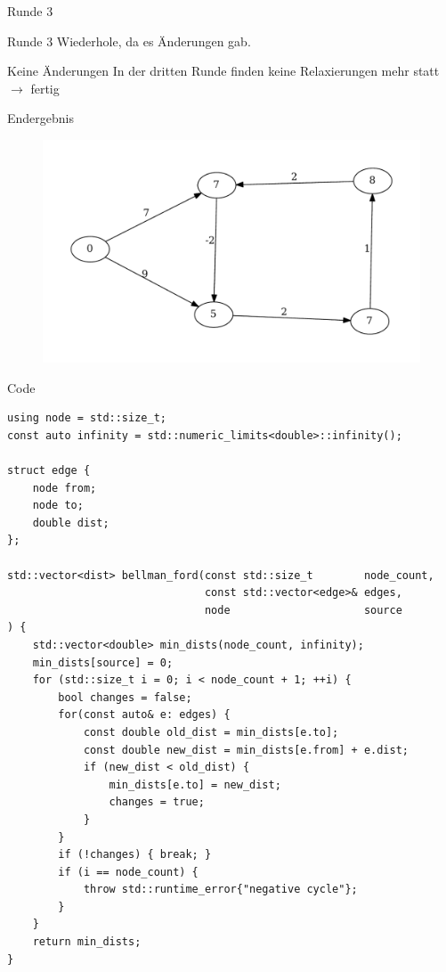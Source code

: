 \begin{frame}{Runde 3}
	\begin{block}{Runde 3}
	Wiederhole, da es Änderungen gab.
	\end{block}
	\begin{block}{Keine Änderungen}
	In der dritten Runde finden keine Relaxierungen mehr statt $\rightarrow$ fertig
	\end{block}
\end{frame}

\begin{frame}{Endergebnis}

\begin{figure}[htbp]
\centering
\includegraphics[width=\linewidth]{bellman_ford_graphs/graph_14.pdf}
\end{figure}

\end{frame}

\begin{frame}[fragile]{Code}
\begin{lstlisting}[basicstyle=\tiny]
using node = std::size_t;
const auto infinity = std::numeric_limits<double>::infinity();

struct edge {
    node from;
    node to;
    double dist;
};

std::vector<dist> bellman_ford(const std::size_t        node_count,
                               const std::vector<edge>& edges,
                               node                     source
) {
    std::vector<double> min_dists(node_count, infinity);
    min_dists[source] = 0;
    for (std::size_t i = 0; i < node_count + 1; ++i) {
        bool changes = false;
        for(const auto& e: edges) {
            const double old_dist = min_dists[e.to];
            const double new_dist = min_dists[e.from] + e.dist;
            if (new_dist < old_dist) {
                min_dists[e.to] = new_dist;
                changes = true;
            }
        }
        if (!changes) { break; }
        if (i == node_count) {
            throw std::runtime_error{"negative cycle"};
        }
    }
    return min_dists;
}
\end{lstlisting}
\end{frame}

